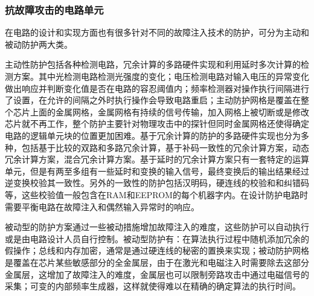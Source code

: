 \documentclass[a4paper,12pt]{article}
\begin{document}
\begin{CJK}{UTF8}{gkai}
\subsubsection{抗故障攻击的电路单元}
在电路的设计和实现方面也有很多针对不同的故障注入技术的防护，可分为主动和被动防护两大类。

主动性防护包括各种检测电路，冗余计算的多路硬件实现和利用延时多次计算的检测方案。其中光检测电路检测光强度的变化；电压检测电路对输入电压的异常变化做出响应并判断变化值是否在电路的容忍阈值内；频率检测器对操作执行间隔进行了设置，在允许的间隔之外时执行操作会导致电路重启；主动防护网格是覆盖在整个芯片上面的金属网格，金属网格有持续的信号传输，加入网格上被切断或是修改芯片就不再工作，整个防护主要针对物理攻击中的探针但同时金属网格还使得确定电路的逻辑单元块的位置更加困难。基于冗余计算的防护的多路硬件实现也分为多种，包括基于比较的双路和多路冗余计算，基于补码一致性的冗余计算方案，动态冗余计算方案，混合冗余计算方案。基于延时的冗余计算方案只有一套特定的运算单元，但是有两至多组有一些延时和变换的输入信号，最终变换后的输出结果经过逆变换校验其一致性。另外的一致性的防护包括汉明码，硬连线的校验和和纠错码等，这些校验值一般包含在RAM和EEPROM的每个机器字内。在设计防护电路时需要平衡电路在故障注入和偶然输入异常时的响应。

被动型的防护方案通过一些被动措施增加故障注入的难度，这些防护可以自动执行或是由电路设计人员自行控制。被动型防护有：在算法执行过程中随机添加冗余的假操作；总线和内存加密，通常是通过硬连线的秘密的置换来实现；被动防护网格是覆盖在芯片某些敏感部分的全金属层，由于在激光和电磁注入时需要除去这部分金属层，这增加了故障注入的难度，金属层也可以限制旁路攻击中通过电磁信号的采集；可变的内部频率生成器，这样就使得难以在精确的确定算法的执行时间。
\end{CJK}
\end{document}
